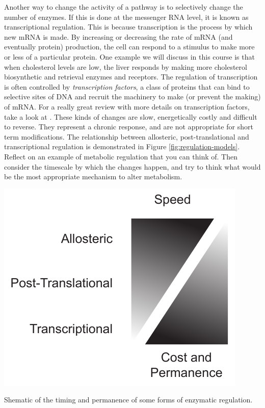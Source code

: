 \documentclass{tufte-handout}
\begin{document}
Another way to change the activity of a pathway is to selectively change the number of enzymes.  If this is done at the messenger RNA level, it is known as transcriptional regulation.  This is because transcription is the process by which new mRNA is made.  By increasing or decreasing the rate of mRNA (and eventually protein) production, the cell can respond to a stimulus to make more or less of a particular protein.  One example we will discuss in this course is that when cholesterol levels are low, the liver responds by making more cholesterol biosynthetic and retrieval enzymes and receptors.  The regulation of transcription is often controlled by \emph{transcription factors}, a class of proteins that can bind to selective sites of DNA and recruit the machinery to make (or prevent the making) of mRNA.  For a really great review with more details on transcription factors, take a look at \citet{Lambert2018}.  These kinds of changes are slow, energetically costly and difficult to reverse.  They represent a chronic response, and are not appropriate for short term modifications.  The relationship between allosteric, post-translational and transcriptional regulation is demonstrated in Figure \ref{fig:regulation-models}.  Reflect on an example of metabolic regulation that you can think of.  Then consider the timescale by which the changes happen, and try to think what would be the most appropriate mechanism to alter metabolism.

\begin{marginfigure}
\includegraphics{figures/regulation-models}
\caption{Shematic of the timing and permanence of some forms of enzymatic regulation.}
\label{fig:regulation-models}
\end{marginfigure}




\end{document}
